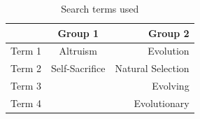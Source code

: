 \documentclass[a4paper]{book}
\begin{document}
\begin{appendices}
\begin{table}[htdp]
\begin{center}
			\begin{tabular}{| l | c | r |}
			\hline
			& Group 1 & Group 2 \\ \hline
			Term 1 & Altruism 	& Evolution  \\ \hline
			Term 2 & Self-Sacrifice	& Natural Selection \\ \hline
			Term 3 & 		& Evolving   \\ \hline
			Term 4 & 		& Evolutionary  \\ \hline\hline
			\end{tabular}
			\end{center}
			\label{table:terms2}
			\caption{Search terms used}
			\end{table}










\end{appendices}
\end{document}
